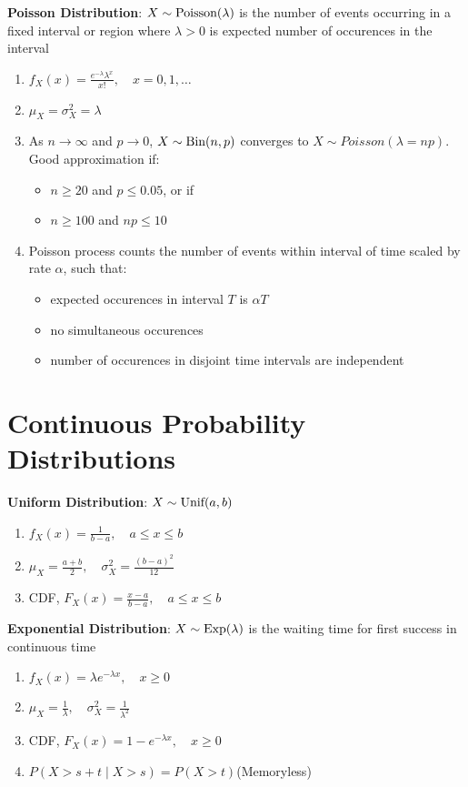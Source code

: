 \documentclass[12pt, a4paper]{article}
\begin{document}
\begin{multicols*}{3}
\textbf{Poisson Distribution}: $X \sim \text{Poisson}(\lambda)$ is the number of events occurring in a fixed interval or region where $\lambda > 0$ is expected number of occurences in the interval
\begin{enumerate}[\roman*.]
  \item $f_X(x) = \frac{e^{-\lambda} \lambda^x}{x!}, \quad x = 0, 1, \dots$
  \item $\mu_X = \sigma^2_X = \lambda$
  \item As $n\rightarrow \infty$ and $p \rightarrow 0$, $X \sim \text{Bin}(n, p)$ converges to $X \sim Poisson(\lambda = np)$. Good approximation if:
    \begin{itemize}\vspace{1pt }
      \item $n\geq 20$ and $p \leq 0.05$, or if 
      \item $n\geq 100$ and $np \leq 10$
    \end{itemize}
  \item Poisson process counts the number of events within interval of time scaled by rate $\alpha$, such that:
    \begin{itemize}\vspace{1pt}
      \item expected occurences in interval $T$ is $\alpha T$
      \item no simultaneous occurences
      \item number of occurences in disjoint time intervals are independent 
    \end{itemize}
\end{enumerate}

\section{Continuous Probability Distributions}
\textbf{Uniform Distribution}: $X \sim \text{Unif}(a, b)$
\begin{enumerate}[\roman*.]
  \item $ f_X(x) = \frac{1}{b - a},\quad a \leq x \leq b $
  \item $ \mu_X = \frac{a + b}{2},\quad \sigma^2_X = \frac{(b - a)^2}{12} $
  \item CDF, $F_X(x) = \frac{x-a}{b-a},\quad a\leq x\leq b$
\end{enumerate}

\textbf{Exponential Distribution}: $ X \sim \text{Exp}(\lambda)$ is the waiting time for first success in continuous time
\begin{enumerate}[\roman*.]
  \item $ f_X(x) = \lambda e^{-\lambda x},\quad x \geq 0 $
  \item $ \mu_X = \frac{1}{\lambda},\quad \sigma^2_X = \frac{1}{\lambda^2} $
  \item CDF, $F_X(x) = 1-e^{-\lambda x},\quad x\geq 0$
  \item $P(X>s+t\mid X>s) = P(X>t)$\hfill(Memoryless)
\end{enumerate}


\end{multicols*}
\end{document}
